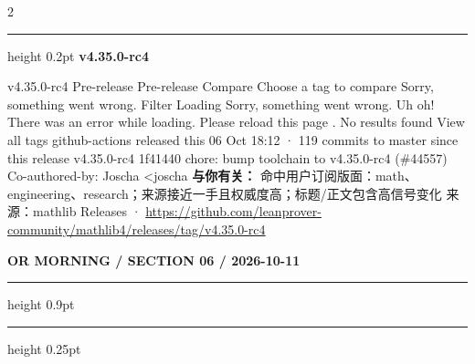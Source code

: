 \documentclass[10.5pt]{ctexart}
\begin{document}
\begin{multicols}{2}
\vspace{2mm}
\hrule height 0.2pt
\vspace{2mm}
{\large\bfseries v4.35.0-rc4}\par
v4.35.0-rc4 Pre-release Pre-release Compare Choose a tag to compare Sorry, something went wrong. Filter Loading Sorry, something went wrong. Uh oh! There was an error while loading. Please reload this page . No results found View all tags github-actions released this 06 Oct 18:12 · 119 commits to master since this release v4.35.0-rc4 1f41440 chore: bump toolchain to v4.35.0-rc4 (\#44557) Co-authored-by: Joscha <joscha
\textbf{与你有关：} 命中用户订阅版面：math、engineering、research；来源接近一手且权威度高；标题/正文包含高信号变化
{\footnotesize\color{ormuted} 来源：mathlib Releases · \url{https://github.com/leanprover-community/mathlib4/releases/tag/v4.35.0-rc4}}
\end{multicols}
\newpage
{\small\bfseries OR MORNING / SECTION 06 / 2026-10-11}
\vspace{2mm}
\hrule height 0.9pt
\vspace{1.5mm}
\hrule height 0.25pt
\vspace{4mm}
\end{document}
